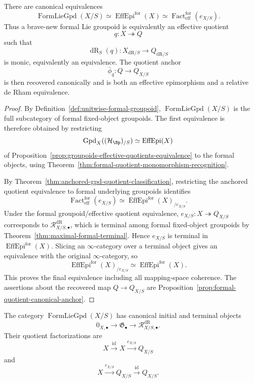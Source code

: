 \begin{theorem}
\label{thm:formal-gpd-quotient-classification}
There are canonical equivalences
\[
    \operatorname{FormLieGpd}(X/S)
    \simeq
    \operatorname{EffEpi}^{\mathrm{for}}(X)
    \simeq
    \operatorname{Fact}^{\mathrm{for}}_{\mathrm{eff}}
    (e_{X/S}).
\]
Thus a brave-new formal Lie groupoid is equivalently an effective quotient
\[
    q:X\twoheadrightarrow Q
\]
such that
\[
    \operatorname{dR}_S(q):
    X_{\mathrm{dR}/S}\to Q_{\mathrm{dR}/S}
\]
is monic, equivalently an equivalence.  The quotient anchor
\[
    \bar\phi_q:Q\longrightarrow Q_{X/S}
\]
is then recovered canonically and is both an effective epimorphism and a
relative de Rham equivalence.
\end{theorem}

\begin{proof}
By Definition~\ref{def:unitwise-formal-groupoid},
$\operatorname{FormLieGpd}(X/S)$ is the full subcategory of formal
fixed-object groupoids.  The first equivalence is therefore obtained by restricting
\[
    \operatorname{Gpd}_X((\mathcal H_{\Sp})_{/S})
    \simeq
    \operatorname{EffEpi}(X)
\]
of Proposition~\ref{prop:groupoids-effective-quotients-equivalence} to the
formal objects, using
Theorem~\ref{thm:formal-quotient-monomorphism-recognition}.

By Theorem~\ref{thm:anchored-gpd-quotient-classification}, restricting the
anchored quotient equivalence to formal underlying groupoids identifies
\[
    \operatorname{Fact}^{\mathrm{for}}_{\mathrm{eff}}(e_{X/S})
    \simeq
    \operatorname{EffEpi}^{\mathrm{for}}(X)_{/e_{X/S}}.
\]
Under the formal groupoid/effective quotient equivalence,
$e_{X/S}:X\twoheadrightarrow Q_{X/S}$ corresponds to
$\mathcal R^{\mathrm{dR}}_{X/S,\bullet}$, which is terminal among formal fixed-object
groupoids by Theorem~\ref{thm:maximal-formal-terminal}.  Hence $e_{X/S}$ is
terminal in $\operatorname{EffEpi}^{\mathrm{for}}(X)$.  Slicing an
$\infty$-category over a terminal object gives an equivalence with the
original $\infty$-category, so
\[
    \operatorname{EffEpi}^{\mathrm{for}}(X)_{/e_{X/S}}
    \simeq
    \operatorname{EffEpi}^{\mathrm{for}}(X).
\]
This proves the final equivalence including all mapping-space coherence.
The assertions about the recovered map $Q\to Q_{X/S}$ are
Proposition~\ref{prop:formal-quotient-canonical-anchor}.
\end{proof}

\begin{corollary}
\label{cor:initial-terminal-formal-gpd}
The category $\operatorname{FormLieGpd}(X/S)$ has canonical initial and
terminal objects
\[
    0_{X,\bullet}
    \longrightarrow
    \mathfrak G_\bullet
    \longrightarrow
    \mathcal R^{\mathrm{dR}}_{X/S,\bullet}.
\]
Their quotient factorizations are
\[
    X\xrightarrow{\operatorname{id}}X
      \xrightarrow{e_{X/S}}Q_{X/S}
\]
and
\[
    X\xrightarrow{e_{X/S}}Q_{X/S}
      \xrightarrow{\operatorname{id}}Q_{X/S}.
\]
\end{corollary}

